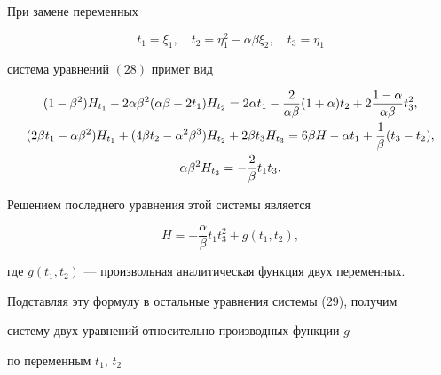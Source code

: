 \begin{prop}


При замене переменных


$$ 


t_1 = \xi_1, \quad t_2 = \eta_1^2 - \alpha \beta \xi_2, \quad t_3 = \eta_1


$$


система уравнений $(28)$ примет вид


\begin{gather}


( 1- \beta^2) H_{t_1} - 


2 \alpha \beta^2 ( \alpha \beta - 2 t_1 ) 


H_{t_2} = 


2 \alpha t_1 - \frac 2{\alpha \beta} ( 1 + \alpha) t_2 


+ 2\frac {1 - \alpha}{\alpha \beta} t_3^2,\notag \\


 ( 2 \beta t_1 - \alpha \beta^2 ) H_{t_1} 


 + ( 4 \beta t_2 - \alpha^2 \beta^3 ) 


H_{t_2}  + 2 \beta t_3 H_{t_3} = 


6 \beta H - \alpha t_1 + \frac 1{ \beta} (t_3 - t_2 ), \notag \\


\alpha \beta^2 H_{t_3} =


- \frac 2{\beta} t_1 t_3.


\end{gather}


\end{prop}





Решением последнего уравнения этой системы является


$$


 H = - \frac{\alpha}{\beta } t_1 t_3^2 + g( t_1, t_2 ),


$$ 


где $ g(t_1,t_2) $ --- произвольная аналитическая функция двух переменных. 





 Подставляя эту формулу в остальные уравнения системы (29), получим


систему двух уравнений относительно производных функции $ g $ 


по переменным $ t_1$, $t_2 $


